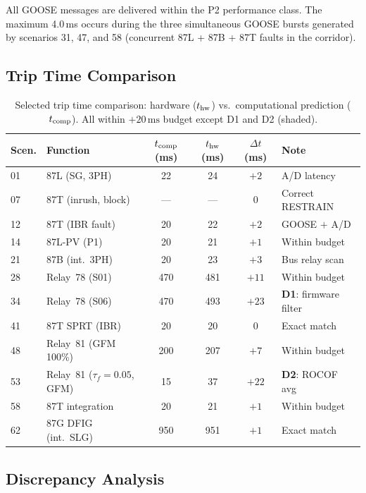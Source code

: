 \documentclass[11pt, a4paper]{article}
\begin{document}
All GOOSE messages are delivered within the P2 performance class.
The maximum 4.0\,ms occurs during the three simultaneous GOOSE bursts
generated by scenarios 31, 47, and 58 (concurrent 87L + 87B + 87T faults
in the corridor).

\subsection{Trip Time Comparison}

\begin{table}[ht]
\centering
\caption{Selected trip time comparison: hardware ($t_{\rm hw}$) vs.\
  computational prediction ($t_{\rm comp}$).
  All within $+20\,\text{ms}$ budget except D1 and D2 (shaded).}
\label{tab:trip_times}
\renewcommand{\arraystretch}{1.1}
\begin{tabular}{llcccl}
\toprule
Scen. & Function & $t_{\rm comp}$ (ms) & $t_{\rm hw}$ (ms) &
  $\Delta t$ (ms) & Note \\
\midrule
01    & 87L (SG, 3PH)       & 22  & 24  & $+2$  & A/D latency \\
07    & 87T (inrush, block)  & ---  & ---  & $0$  & Correct RESTRAIN \\
12    & 87T (IBR fault)     & 20  & 22  & $+2$  & GOOSE $+$ A/D \\
14    & 87L-PV (P1)         & 20  & 21  & $+1$  & Within budget \\
21    & 87B (int.\ 3PH)     & 20  & 23  & $+3$  & Bus relay scan \\
28    & Relay~78 (S01)      & 470 & 481 & $+11$ & Within budget \\
\rowcolor{yellow!30}
34    & Relay~78 (S06)      & 470 & 493 & $+23$ & \textbf{D1}: firmware filter \\
41    & 87T SPRT (IBR)      & 20  & 20  & $0$   & Exact match \\
48    & Relay~81 (GFM 100\%)& 200 & 207 & $+7$  & Within budget \\
\rowcolor{yellow!30}
53    & Relay~81 ($\tau_f = 0.05$, GFM) & 15 & 37 & $+22$ & \textbf{D2}: ROCOF avg \\
58    & 87T integration     & 20  & 21  & $+1$  & Within budget \\
62    & 87G DFIG (int.\ SLG)& 950 & 951 & $+1$  & Exact match \\
\bottomrule
\end{tabular}
\end{table}

\subsection{Discrepancy Analysis}
\label{sec:disc}
\end{document}
